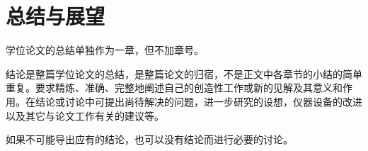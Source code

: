 \chapter{总结与展望}
学位论文的总结单独作为一章，但不加章号。

结论是整篇学位论文的总结，是整篇论文的归宿，不是正文中各章节的小结的简单重复。要求精炼、准确、完整地阐述自己的创造性工作或新的见解及其意义和作用。在结论或讨论中可提出尚待解决的问题，进一步研究的设想，仪器设备的改进以及其它与论文工作有关的建议等。

如果不可能导出应有的结论，也可以没有结论而进行必要的讨论。